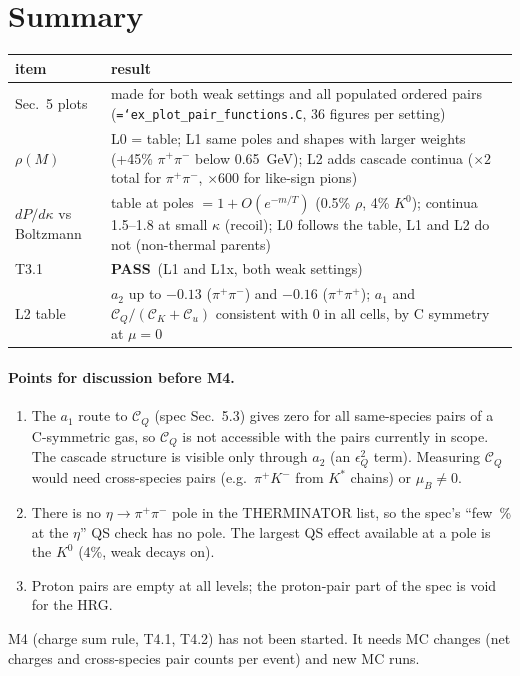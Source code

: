 \documentclass[11pt,a4paper]{article}
\newcommand{\CK}{\mathcal C_K}
\newcommand{\Cu}{\mathcal C_u}
\newcommand{\CQ}{\mathcal C_Q}
\newcommand{\pass}{\textcolor{green!45!black}{\textbf{PASS}}}
\newcommand{\code}[1]{\texttt{\hyphenchar\font=`\-#1}}
\begin{document}
\section{Summary}

\begin{table}[H]
\centering\small
\begin{tabular}{lp{10.5cm}}
\toprule
item & result \\
\midrule
Sec.~5 plots & made for both weak settings and all populated ordered pairs
  (\code{ex\_plot\_pair\_functions.C}, 36 figures per setting) \\
$\rho(M)$ & L0 = table; L1 same poles and shapes with larger weights (+45\% $\pi^+\pi^-$ below
  0.65~GeV); L2 adds cascade continua ($\times2$ total for $\pi^+\pi^-$, $\times600$ for like-sign pions) \\
$dP/d\kappa$ vs Boltzmann & table at poles $=1+O(e^{-m/T})$ (0.5\% $\rho$, 4\% $K^0$); continua
  1.5--1.8 at small $\kappa$ (recoil); L0 follows the table, L1 and L2 do not (non-thermal parents) \\
T3.1 & \pass\ (L1 and L1x, both weak settings) \\
L2 table & $a_2$ up to $-0.13$ ($\pi^+\pi^-$) and $-0.16$ ($\pi^+\pi^+$); $a_1$ and
  $\CQ/(\CK+\Cu)$ consistent with 0 in all cells, by C symmetry at $\mu=0$ \\
\bottomrule
\end{tabular}
\end{table}

\paragraph{Points for discussion before M4.}
\begin{enumerate}\itemsep1pt
\item The $a_1$ route to $\CQ$ (spec Sec.~5.3) gives zero for all same-species pairs of a
  C-symmetric gas, so $\CQ$ is not accessible with the pairs currently in scope. The cascade
  structure is visible only through $a_2$ (an $\epsilon_Q^2$ term). Measuring $\CQ$ would need
  cross-species pairs (e.g.\ $\pi^+K^-$ from $K^*$ chains) or $\mu_B\ne0$.
\item There is no $\eta\to\pi^+\pi^-$ pole in the THERMINATOR list, so the spec's ``few~\% at
  the $\eta$'' QS check has no pole. The largest QS effect available at a pole is the $K^0$ (4\%,
  weak decays on).
\item Proton pairs are empty at all levels; the proton-pair part of the spec is void for the HRG.
\end{enumerate}

\noindent M4 (charge sum rule, T4.1, T4.2) has not been started. It needs MC changes (net charges
and cross-species pair counts per event) and new MC runs.
\end{document}
